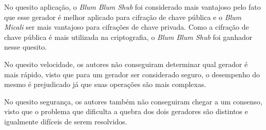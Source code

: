 No quesito aplicação, o \textit{Blum Blum Shub} foi considerado mais vantajoso pelo fato que esse gerador é melhor aplicado para cifração de chave pública e o \textit{Blum Micali} ser mais vantajoso para cifrações de chave privada. Como a cifração de chave pública é mais utilizada na criptografia, o \textit{Blum Blum Shub} foi ganhador nesse quesito.

No quesito velocidade, os autores não conseguiram determinar qual gerador é mais rápido, visto que para um gerador ser considerado seguro, o desempenho do mesmo é prejudicado já que suas operações são mais complexas.

No quesito segurança, os autores também não conseguiram chegar a um consenso, visto que o problema que dificulta a quebra dos dois geradores são distintos e igualmente difíceis de serem resolvidos.